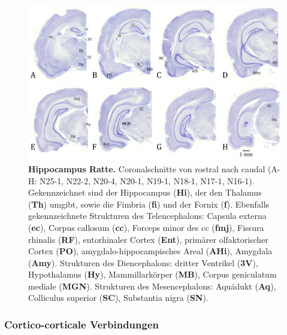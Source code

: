 \documentclass[12pt,a4paper,pdftex]{article}
\begin{document}
\begin{figure}[H]
    \centering
    \includegraphics[width=\textwidth]{pictures/Bilder_Jule/Ratte/hippocampus.png}
    \caption[Hippocampus Ratte]{\textbf{Hippocampus Ratte.} Coronalschnitte von rostral nach caudal (A-H: N25-1, N22-2, N20-4, N20-1, N19-1, N18-1, N17-1, N16-1). Gekennzeichnet sind der Hippocampus (\textbf{Hi}), der den Thalamus (\textbf{Th}) umgibt, sowie die Fimbria (\textbf{fi}) und der Fornix (\textbf{f}). Ebenfalls gekennzeichnete Strukturen des Telencephalons: Capsula externa (\textbf{ec}), Corpus callosum (\textbf{cc}), Forceps minor des cc (\textbf{fmj}), Fissura rhinalis (\textbf{RF}), entorhinaler Cortex  (\textbf{Ent}), primärer olfaktorischer Cortex (\textbf{PO}), amygdalo-hippocampisches Areal (\textbf{AHi}), Amygdala (\textbf{Amy}). Strukturen des Diencephalons: dritter Ventrikel (\textbf{3V}), Hypothalamus (\textbf{Hy}), Mammillarkörper (\textbf{MB}), Corpus geniculatum mediale (\textbf{MGN}). Strukturen des Mesencephalons: Aquädukt (\textbf{Aq}), Colliculus superior (\textbf{SC}), Substantia nigra (\textbf{SN}).}
    \label{fig:hippocampus_ratte}
\end{figure}{}

\subsubsection*{Cortico-corticale Verbindungen}
\label{subsubsec:cortico-cortical}
\end{document}
